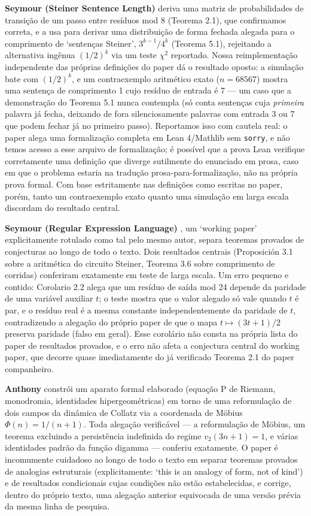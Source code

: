 \documentclass[11pt]{article}
\begin{document}
\textbf{Seymour (Steiner Sentence Length)} \cite{Seymour2026a} deriva
uma matriz de probabilidades de transição de um passo entre resíduos
mod 8 (Teorema 2.1), que confirmamos correta, e a usa para derivar uma
distribuição de forma fechada alegada para o comprimento de `sentenças
Steiner', $3^{k-1}/4^k$ (Teorema 5.1), rejeitando a alternativa ingênua
$(1/2)^k$ via um teste $\chi^2$ reportado. Nossa reimplementação
independente das próprias definições do paper dá o resultado oposto:
a simulação bate com $(1/2)^k$, e um contraexemplo aritmético exato
($n=68567$) mostra uma sentença de comprimento 1 cujo resíduo de
entrada é 7 --- um caso que a demonstração do Teorema 5.1 nunca
contempla (só conta sentenças cuja \emph{primeira} palavra já fecha,
deixando de fora silenciosamente palavras com entrada 3 ou 7 que podem
fechar já no primeiro passo). Reportamos isso com cautela real: o paper
alega uma formalização completa em Lean 4/Mathlib sem \texttt{sorry}, e
não temos acesso a esse arquivo de formalização; é possível que a prova
Lean verifique corretamente uma definição que diverge sutilmente do
enunciado em prosa, caso em que o problema estaria na tradução
prosa-para-formalização, não na própria prova formal. Com base
estritamente nas definições como escritas no paper, porém, tanto um
contraexemplo exato quanto uma simulação em larga escala discordam do
resultado central.

\textbf{Seymour (Regular Expression Language)} \cite{Seymour2026b}, um
`working paper' explicitamente rotulado como tal pelo mesmo autor,
separa teoremas provados de conjecturas ao longo de todo o texto. Dois
resultados centrais (Proposición 3.1 sobre a aritmética do circuito
Steiner, Teorema 3.6 sobre comprimento de corridas) conferiram
exatamente em teste de larga escala. Um erro pequeno e contido:
Corolario 2.2 alega que um resíduo de saída mod 24 depende da paridade
de uma variável auxiliar $t$; o teste mostra que o valor alegado só
vale quando $t$ é par, e o resíduo real é a mesma constante
independentemente da paridade de $t$, contradizendo a alegação do
próprio paper de que o mapa $t \mapsto (3t+1)/2$ preserva paridade
(falso em geral). Esse corolário não consta na própria lista do paper
de resultados provados, e o erro não afeta a conjectura central do
working paper, que decorre quase imediatamente do já verificado Teorema
2.1 do paper companheiro.

\textbf{Anthony} \cite{Anthony2026} constrói um aparato formal elaborado
(equação P de Riemann, monodromia, identidades hipergeométricas) em
torno de uma reformulação de dois campos da dinâmica de Collatz via a
coordenada de Möbius $\Phi(n) = 1/(n+1)$. Toda alegação verificável ---
a reformulação de Möbius, um teorema excluindo a persistência
indefinida do regime $v_2(3n+1)=1$, e várias identidades padrão da
função digamma --- conferiu exatamente. O paper é incomumente cuidadoso
ao longo de todo o texto em separar teoremas provados de analogias
estruturais (explicitamente: `this is an analogy of form, not of
kind') e de resultados condicionais cujas condições não estão
estabelecidas, e corrige, dentro do próprio texto, uma alegação
anterior equivocada de uma versão prévia da mesma linha de pesquisa.
\end{document}
